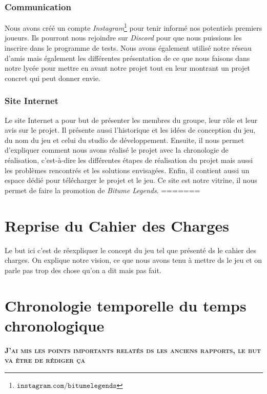 \documentclass[a4paper,12pt]{article}
\newcommand{\btmlgs}{\textsl{Bitume Legends}}
\begin{document}
            \subsubsection{Communication}
                Nous avons créé un compte \textsl{Instagram}\footnote{\(\mathtt{instagram.com/bitumelegends}\)}
                pour tenir informé nos potentiels premiers joueurs. 
                Ils pourront nous rejoindre sur \textsl{Discord} pour que nous puissions les inscrire dans le
                programme de tests. Nous avons également utilisé notre réseau d'amis mais également les différentes 
                présentation de ce que nous faisons dans notre lycée pour mettre en avant notre projet tout en leur 
                montrant un projet concret qui peut donner envie.
        
            \subsubsection{Site Internet}
                Le site Internet a pour but de présenter les membres du groupe, leur rôle et leur avis sur le projet.
                Il présente aussi l'historique et les idées de conception du jeu, du nom du jeu et celui du studio
                de développement. Ensuite, il nous permet d'expliquer comment nous avons réalisé le projet avec la
                chronologie de réalisation, c'est-à-dire les différentes étapes de réalisation du projet mais aussi
                les problèmes rencontrés et les solutions envisagées. Enfin, il contient aussi
                un espace dédié pour télécharger le projet et le jeu. Ce site est notre vitrine, il nous permet de 
                faire la promotion de \btmlgs.
=======
    \lipsum[1-2]


    \section{Reprise du Cahier des Charges}
    Le but ici c'est de réexpliquer le concept du jeu tel que présenté ds le cahier des charges. 
    On explique notre vision, ce que nous avons tenu à mettre ds le jeu et on parle pas trop des
    chose qu'on a dit mais pas fait.
    \clearpage
    \newpage


    \section{Chronologie temporelle du temps chronologique}
    \textbf\textsc{J'ai mis les points importants relatés ds les anciens rapports, le but va être de rédiger ça}
\end{document}
